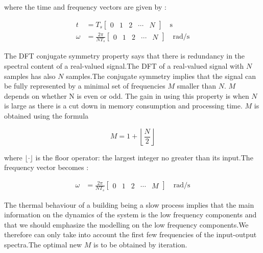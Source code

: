 \documentclass[a4paper,12pt]{article}
\numberwithin{equation}{section}
\begin{document}
\noindent
where the time and frequency vectors are given by :

\begin{equation}
\begin{aligned}
t &=T_{s}\left[\begin{array}{lllll}
0 & 1 & 2 & \cdots & N
\end{array}\right] \quad \mathrm{s} \\
\omega &=\frac{2 \pi}{N T_{s}}\left[\begin{array}{lllll}
0 & 1 & 2 & \cdots & N
\end{array}\right] \quad \mathrm{rad} / \mathrm{s}
\end{aligned}
\end{equation}

The DFT conjugate symmetry property says that there is redundancy in the spectral content of a real-valued signal.The DFT of a  real-valued signal with $N$ samples has also $N$ samples.The conjugate symmetry implies that  the signal can be fully represented by a minimal set of frequencies $M$ smaller than $N$. $M$ depends on whether N is even or odd. The gain in using this property is when $N$ is large as there is a cut down in memory consumption and processing time. $M$ is obtained using the formula 

\begin{equation}
M=1+\left\lfloor\frac{N}{2}\right\rfloor   
\end{equation}


\noindent
where $\lfloor\cdot\rfloor$ is the floor operator: the largest integer no greater than its input.The frequency vector becomes :

\begin{equation}
\begin{aligned}
\omega &=\frac{2 \pi}{N T_{s}}\left[\begin{array}{lllll}
0 & 1 & 2 & \cdots & M
\end{array}\right] \quad \mathrm{rad} / \mathrm{s}
\end{aligned}
\end{equation}

The thermal behaviour of a building being a slow process implies that the main information on the dynamics of the system is the low frequency components and that we should emphasize the modelling on the low frequency components.We therefore can only take into account the first few frequencies of the input-output spectra.The optimal new $M$ is to be obtained by iteration.
\end{document}
